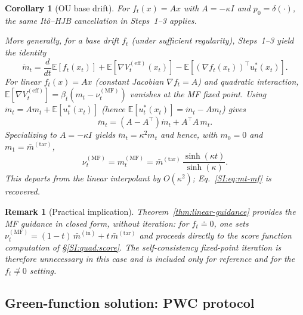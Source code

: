 \documentclass[11pt,onecolumn]{article}
\newcommand{\MF}{\mathrm{MF}}
\newcommand{\Veff}{V^{(\mathrm{eff})}}
\newtheorem{corollary}[theorem]{Corollary}
\newtheorem{remark}{Remark}[section]
\begin{document}
\begin{corollary}[OU base drift]
\label{cor:OU}
For $f_t(x) = A x$ with $A = -\kappa I$ and $p_0=\delta(\cdot)$, the same It\^o--HJB cancellation in Steps~1--3 applies.

More generally, for a base drift $f_t$ (under sufficient regularity), Steps~1--3 yield the identity
\[
\ddot m_t
= \frac{d}{dt}\mathbb E[f_t(x_t)]
  + \mathbb E[\nabla \Veff_t(x_t)]
  - \mathbb E[(\nabla f_t(x_t))^\top u_t^*(x_t)].
\]
For linear $f_t(x)=A x$ (constant Jacobian $\nabla f_t = A$) and quadratic interaction, $\mathbb E[\nabla \Veff_t]=\beta_t(m_t-\nu_t^{(\MF)})$ vanishes at the MF fixed point. Using $\dot m_t = A m_t + \mathbb E[u_t^*(x_t)]$ (hence $\mathbb E[u_t^*(x_t)] = \dot m_t - A m_t$) gives
\[
\ddot m_t = (A-A^\top)\dot m_t + A^\top A\,m_t.
\]
Specializing to $A=-\kappa I$ yields $\ddot m_t=\kappa^2 m_t$ and hence, with $m_0=0$ and $m_1=\bar m^{(\mathrm{tar})}$,
\begin{equation}
  \nu_t^{(\MF)} = m_t^{(\MF)}= \bar m^{(\mathrm{tar})}\,\frac{\sinh(\kappa t)}{\sinh(\kappa)}.
  \label{SI:eq:nu-OU}
\end{equation}
This departs from the linear interpolant by $O(\kappa^2)$; Eq.~\eqref{SI:eq:mt-mf} is recovered.
\end{corollary}




\begin{remark}[Practical implication] Theorem~\ref{thm:linear-guidance} provides the MF guidance \emph{in closed form}, without iteration: for $f_t\doteq 0$, one sets $\nu_t^{(\MF)} = (1-t)\,\bar m^{(\mathrm{in})} + t\,\bar m^{(\mathrm{tar})}$ and proceeds directly to the score function computation of
\S\ref{SI:quad:score}.
The self-consistency fixed-point iteration is therefore unnecessary in this case and is included only for reference and for the $f_t \not\doteq 0$ setting.
\end{remark}

\subsection{Green-function solution: PWC protocol}
\label{SI:quad:pwc}
\end{document}
